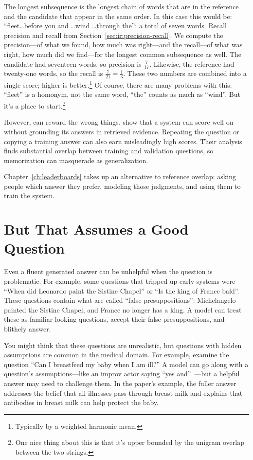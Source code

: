 The longest subsequence is the longest chain of words that are in the reference and the candidate that appear in the same order.  In this case this would be: ``fleet\dots before you and \dots wind \dots through the'': a total of seven words.  Recall precision and recall from Section~\ref{sec:ir:precision-recall}.  We compute the precision---of what we found, how much was right---and the recall---of what was right, how much did we find---for the longest common subsequence as well.  The candidate had seventeen words, so precision is $\frac{7}{17}$.  Likewise, the reference had twenty-one words, so the recall is $\frac{7}{21}=\frac{1}{3}$.  These two numbers are combined into a single score; higher is better.\footnote{Typically by a weighted harmonic mean.}  Of course, there are many problems with this: ``fleet'' is a homonym, not the same word, ``the'' counts as much as ``wind''.  But it's a place to start.\footnote{One nice thing about this is that it's upper bounded by the unigram overlap between the two strings.}

However,  can reward the wrong things.  \citet{krishna-21} show that a system can score well on  without grounding its answers in retrieved evidence.  Repeating the question or copying a training answer can also earn misleadingly high scores.  Their analysis finds substantial overlap between training and validation questions, so memorization can masquerade as generalization.

Chapter~\ref{ch:leaderboards} takes up an alternative to reference overlap: asking people which answer they prefer, modeling those judgments, and using them to train the system.

\section{But That Assumes a Good Question}
\label{sec:methods:presuppositions}

Even a fluent generated answer can be unhelpful when the question is problematic.  For example, some questions that tripped up early  systems were ``When did Leonardo paint the Sistine Chapel'' or ``Is the king of France bald''.  These questions contain what are called ``false presuppositions'': Michelangelo painted the Sistine Chapel, and France no longer has a king.  A model can treat these as familiar-looking questions, accept their false presuppositions, and blithely answer.

You might think that these questions are unrealistic, but questions with hidden assumptions are common in the medical domain.
For example, \citet{srikanth-24-pregnant} examine the question ``Can I breastfeed my baby when I am ill?''  A model can go along with a question's assumptions---like an improv actor saying ``yes and''~\citep{cho-20-spolin}---but a helpful answer may need to challenge them.  In the paper's example, the fuller answer addresses the belief that all illnesses pass through breast milk and explains that antibodies in breast milk can help protect the baby.

